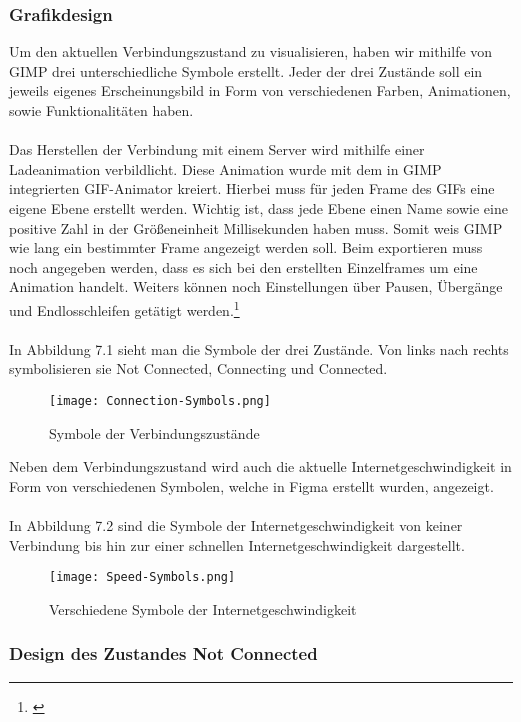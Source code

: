 \subsubsection{Grafikdesign}

Um den aktuellen Verbindungszustand zu visualisieren, haben wir mithilfe von GIMP drei unterschiedliche Symbole erstellt. Jeder der drei Zustände soll ein jeweils eigenes Erscheinungsbild in Form von verschiedenen Farben, Animationen, sowie Funktionalitäten haben. 
\\ \ \\
Das Herstellen der Verbindung mit einem Server wird mithilfe einer Ladeanimation verbildlicht. Diese Animation wurde mit dem in GIMP integrierten GIF-Animator kreiert. Hierbei muss für jeden Frame des GIFs eine eigene Ebene erstellt werden. Wichtig ist, dass jede Ebene einen Name sowie eine positive Zahl in der Größeneinheit Millisekunden haben muss. Somit weis GIMP wie lang ein bestimmter Frame angezeigt werden soll. Beim exportieren muss noch angegeben werden, dass es sich bei den erstellten Einzelframes um eine Animation handelt. Weiters können noch Einstellungen über Pausen, Übergänge und Endlosschleifen getätigt werden.\footnote[1]{\cite[Vgl.][]{GIF}}
\\ \ \\
In Abbildung 7.1 sieht man die Symbole der drei Zustände. Von links nach rechts symbolisieren sie Not Connected, Connecting und Connected.
\\
\begin{figure}[H]
    \centering
    \texttt{[image: Connection-Symbols.png]}
    \caption{Symbole der Verbindungszustände} 
\end{figure}
\noindent
Neben dem Verbindungszustand wird auch die aktuelle Internetgeschwindigkeit in Form von verschiedenen Symbolen, welche in Figma erstellt wurden, angezeigt.
\\ \ \\
In Abbildung 7.2 sind die Symbole der Internetgeschwindigkeit von keiner Verbindung bis hin zur einer schnellen Internetgeschwindigkeit dargestellt.
\\
\begin{figure}[H]
    \centering
    \texttt{[image: Speed-Symbols.png]}
    \caption{Verschiedene Symbole der Internetgeschwindigkeit} 
\end{figure}

\pagebreak

\subsubsection{Design des Zustandes Not Connected}

